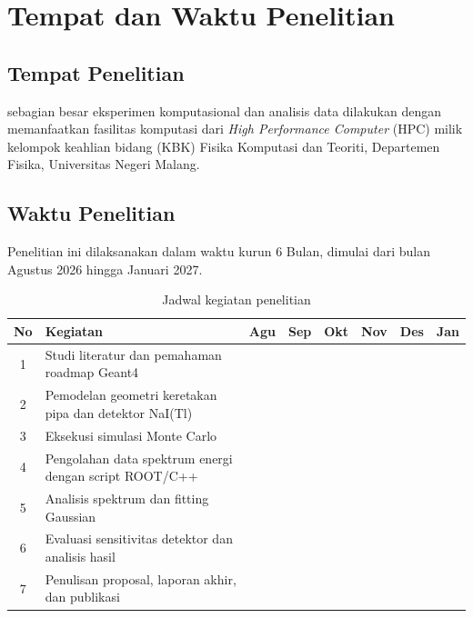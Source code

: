 \documentclass[12pt,a4paper]{report}
\begin{document}
\section{Tempat dan Waktu Penelitian}
\subsection{Tempat Penelitian}
sebagian besar eksperimen komputasional dan analisis data dilakukan dengan memanfaatkan fasilitas komputasi dari \textit{High Performance Computer} (HPC) milik kelompok keahlian bidang 
(KBK) Fisika Komputasi dan Teoriti, Departemen Fisika, Universitas Negeri Malang.


\subsection{Waktu Penelitian}
Penelitian ini dilaksanakan dalam waktu kurun 6 Bulan, dimulai dari bulan Agustus 2026 hingga Januari 2027.
\begin{table}[H]
\centering
\caption{Jadwal kegiatan penelitian}
\label{tab:jadwal-penelitian}
\begin{tabular}{|c|>{\raggedright\arraybackslash}p{6cm}|c|c|c|c|c|c|}
\hline
\textbf{No} & \textbf{Kegiatan} & \textbf{Agu} & \textbf{Sep} & \textbf{Okt} & \textbf{Nov} & \textbf{Des} & \textbf{Jan} \\
\hline
1 & Studi literatur dan pemahaman roadmap Geant4 & \cellcolor{lightgreen} & \cellcolor{lightgreen} &  &  &  &\\
\hline
2 & Pemodelan geometri keretakan pipa dan detektor NaI(Tl) &  & \cellcolor{lightgreen} & \cellcolor{lightgreen} &  &  &\\
\hline
3 & Eksekusi simulasi Monte Carlo &  &  & \cellcolor{lightgreen} & \cellcolor{lightgreen} &  &\\
\hline
4 & Pengolahan data spektrum energi dengan script ROOT/C++ &  &  &  & \cellcolor{lightgreen} &  &\\
\hline
5 & Analisis spektrum dan fitting Gaussian &  &  &  & \cellcolor{lightgreen} & \cellcolor{lightgreen} &\\
\hline
6 & Evaluasi sensitivitas detektor dan analisis hasil &  &  &  &  & \cellcolor{lightgreen} &\\
\hline
7 & Penulisan proposal, laporan akhir, dan publikasi &  &  &  &  & & \cellcolor{lightgreen} \\
\hline
\end{tabular}
\end{table}
\end{document}
